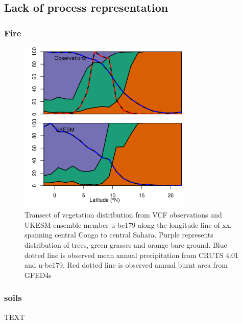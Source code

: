\documentclass[bg, manuscript]{copernicus}
\begin{document}
\subsection{Lack of process representation}

\subsubsection{Fire}

\begin{figure}[t]
\includegraphics[width=8.3cm]{figs/trasect_AFRICA.png}
\caption{Transect of vegetation distribution from VCF observations and UKESM ensemble member u-bc179 along the longitude line of xx, spanning central Congo to central Sahara. Purple represents distribution of trees, green grasses and orange bare ground. Blue dotted line is observed mean annual precipitation from CRUTS 4.01 and u-bc179. Red dotted line is observed annual burnt area from GFED4s}
\end{figure}

\subsubsection{soils}




\conclusions  %
TEXT

\end{document}
